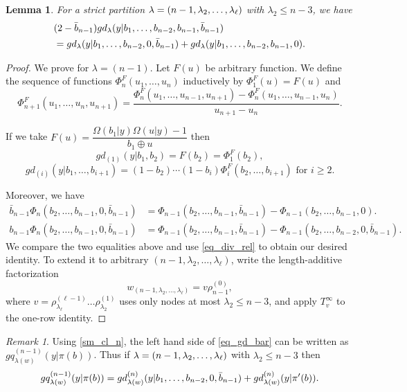 \documentclass[a4paper]{amsart}
\newtheorem{lem}[thm]{Lemma}
\theoremstyle{remark}
\newtheorem{remark}[thm]{Remark}
\numberwithin{equation}{section}
\begin{document}
\begin{lem}\label{lem_sm_cl_type_D}
For a strict partition
$\lambda=(n-1,\lambda_2,\ldots,\lambda_\ell)$ with $\lambda_2\leq n-3$, we have
\begin{align}\label{eq_gd_bar}
&(2-\bar{b}_{n-1})
gd_{\lambda}(y| b_1,\ldots,b_{n-2},b_{n-1},\bar{b}_{n-1})\nonumber\\
&=gd_{\lambda}(y| b_1,\ldots,b_{n-2},0,\bar{b}_{n-1})
+gd_{\lambda}(y| b_1,\ldots,b_{n-2},b_{n-1},0).
\end{align}
\end{lem}
\begin{proof}
We prove for $\lambda=(n-1).$
Let $F(u)$ be arbitrary function. We define the sequence of functions  
$\Phi_n^F(u_1,\ldots,u_n)$ inductively by
$\Phi_1^F(u)=F(u)$ and 
    $$\Phi_{n+1}^F(u_1,\ldots,u_n,u_{n+1})=
    \frac{\Phi_n^F(u_1,\ldots,u_{n-1},u_{n+1})-\Phi_n^F(u_1,\ldots,u_{n-1},u_{n})}{u_{n+1}-u_{n}}.$$


If we take
    $F(u)=\dfrac{\Omega(b_1| y)\Omega(u| y)-1}{b_1\oplus u}$
    then
    $$gd_{(1)}(y| b_1,b_2)=F(b_2)=\Phi_1^F(b_2), $$ 
\begin{equation}\label{eq_div_rel}
     gd_{(i)}(y| b_1,\dots,b_{i+1})=(1-b_2)\cdots (1-b_i)\Phi^{F}_{i}(b_2,\ldots,b_{i+1}) \text{ for } i\ge 2.
\end{equation}
   
Moreover, we have \begin{align*}
\bar{b}_{n-1} \Phi_{n}(b_2,\ldots,b_{n-1},0,\bar{b}_{n-1})&=\Phi_{n-1}(b_2,\ldots,b_{n-1},\bar{b}_{n-1})-\Phi_{n-1}(b_2,\ldots,b_{n-1},0).\\
{b}_{n-1} \Phi_{n}(b_2,\ldots,b_{n-1},0,\bar{b}_{n-1})&=\Phi_{n-1}(b_2,\ldots,b_{n-1},\bar{b}_{n-1})-\Phi_{n-1}(b_2,\ldots,b_{n-2},0,\bar{b}_{n-1}).
\end{align*}
We compare the two equalities above and use \eqref{eq_div_rel} to obtain our desired identity.
To extend it to arbitrary $(n-1,\lambda_2,\dots,\lambda_\ell)$, write the length-additive factorization
\[
w_{(n-1,\lambda_2,\dots,\lambda_\ell)}=v\rho_{n-1}^{(0)},
\]
where \(v=\rho_{\lambda_\ell}^{(\ell-1)}\dots\rho_{\lambda_2}^{(1)}\) uses only nodes at most \(\lambda_2\le n-3\), and apply \(T_{v}^\infty\) to the one-row identity.
\end{proof}


\begin{remark}
   Using \eqref{sm_cl_n}, the left hand side of \eqref{eq_gd_bar} can be written as $gq_{\lambda(w)}^{(n-1)}(y| \pi(b))$. Thus if $\lambda=(n-1,\lambda_2,\ldots,\lambda_\ell)$ with $\lambda_2\leq n-3$ then 
$$gq_{\lambda(w)}^{(n-1)}(y| \pi(b))=gd_{\lambda(w)}^{(n)}(y| b_1,\ldots,b_{n-2},0,\bar{b}_{n-1})
+gd_{\lambda(w)}^{(n)}(y| \pi'(b)).$$
\end{remark}
\end{document}
